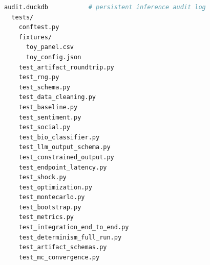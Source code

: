\documentclass[11pt]{article}
\begin{document}
\begin{lstlisting}[language=bash, basicstyle=\ttfamily\footnotesize,
    keywordstyle=\color{black}, frame=single, backgroundcolor=\color{lightgray}]
    audit.duckdb           # persistent inference audit log
  tests/
    conftest.py
    fixtures/
      toy_panel.csv
      toy_config.json
    test_artifact_roundtrip.py
    test_rng.py
    test_schema.py
    test_data_cleaning.py
    test_baseline.py
    test_sentiment.py
    test_social.py
    test_bio_classifier.py
    test_llm_output_schema.py
    test_constrained_output.py
    test_endpoint_latency.py
    test_shock.py
    test_optimization.py
    test_montecarlo.py
    test_bootstrap.py
    test_metrics.py
    test_integration_end_to_end.py
    test_determinism_full_run.py
    test_artifact_schemas.py
    test_mc_convergence.py
\end{lstlisting}
\end{document}
